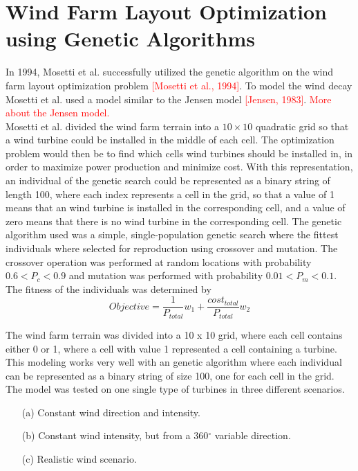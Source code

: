\documentclass{article}
\begin{document}
\section{Wind Farm Layout Optimization using Genetic Algorithms}


In 1994, Mosetti et al. successfully utilized the genetic algorithm on the wind farm layout optimization problem \textcolor{red}{[Mosetti et al., 1994]}. To model the wind decay Mosetti et al. used a model similar to the Jensen model \textcolor{red}{[Jensen, 1983]}. \textcolor{red}{More about the Jensen model.}\\

\noindent Mosetti et al. divided the wind farm terrain into a $10\times10$ quadratic grid so that a wind turbine could be installed in the middle of each cell. The optimization problem would then be to find which cells wind turbines should be installed in, in order to maximize power production and minimize cost. With this representation, an individual of the genetic search could be represented as a binary string of length 100, where each index represents a cell in the grid, so that a value of 1 means that an wind turbine is installed in the corresponding cell, and a value of zero means that there is no wind turbine in the corresponding cell. The genetic algorithm used was a simple, single-population genetic search where the fittest individuals where selected for reproduction using crossover and mutation. The crossover operation was performed at random locations with probability $0.6 < P_c < 0.9$ and mutation was performed with probability $0.01 < P_m < 0.1$. The fitness of the individuals was determined by  \\


\begin{equation}
Objective = \frac{1}{P_{total}}w_1 + \frac{cost_{total}}{P_{total}}w_2
\end{equation}


\noindent The wind farm terrain was divided into a 10 x 10 grid, where each cell contains either 0 or 1, where a cell with value 1 represented a cell containing a turbine. This modeling works very well with an genetic algorithm where each individual can be represented as a binary string of size 100, one for each cell in the grid. \\




The model was tested on one single type of turbines in three different scenarios. \\


\begin{itemize}
\item[(a)] Constant wind direction and intensity.
\item[(b)] Constant wind intensity, but from a 360$^{\circ}$ variable direction.
\item[(c)] Realistic wind scenario.
\end{itemize}
\end{document}
